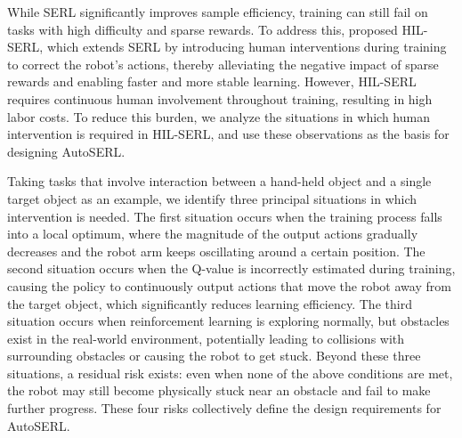 \documentclass[runningheads]{llncs}
\begin{document}

While SERL significantly improves sample efficiency, training can still fail on tasks with high difficulty and sparse rewards. To address this, \cite{luo2025precise} proposed HIL-SERL, which extends SERL by introducing human interventions during training to correct the robot's actions, thereby alleviating the negative impact of sparse rewards and enabling faster and more stable learning. However, HIL-SERL requires continuous human involvement throughout training, resulting in high labor costs. To reduce this burden, we analyze the situations in which human intervention is required in HIL-SERL, and use these observations as the basis for designing AutoSERL.

Taking tasks that involve interaction between a hand-held object and a single
target object as an example, we identify three principal situations in which
intervention is needed. The first situation occurs when the training process
falls into a local optimum, where the magnitude of the output actions gradually
decreases and the robot arm keeps oscillating around a certain position. The
second situation occurs when the Q-value is incorrectly estimated during
training, causing the policy to continuously output actions that move the robot
away from the target object, which significantly reduces learning efficiency.
The third situation occurs when reinforcement learning is exploring normally,
but obstacles exist in the real-world environment, potentially leading to
collisions with surrounding obstacles or causing the robot to get stuck. Beyond
these three situations, a residual risk exists: even when none of the above
conditions are met, the robot may still become physically stuck near an obstacle
and fail to make further progress. These four risks collectively define the
design requirements for AutoSERL.
\end{document}
